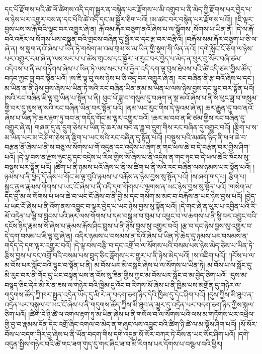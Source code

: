 དང་པོ་རྫོགས་པའི་ཚེ་ལོ་ཚིགས་འདི་དག་སྦྱར་ན་བསྙེན་པར་རྫོགས་པ་མི་འགྲུབ་པ་ནི་མེད་ཀྱི་རྫོགས་པར་བྱེད་པ་ལ་ཉེས་པར་འགྱུར་བས་ན་དང་པོའི་ཚེ་འདི་དང་མ་སྦྱོར་ཅིག་པའོ། །མ་ཚང་བར་བསྙེན་པར་རྫོགས་པའོ།། །།ཇི་ལྟར་བྱས་པས་ས་རྐོ་བའི་ལྟུང་བར་འགྱུར་ཞེ་ན། རྐོ་འམ་རྐོར་བཅུག་ནའོ་ཞེས་པ་ལ་{སྩོགས་,སོགས་}པ་ཡིན་ནོ། །དེ་ལ་རྐོ་བའི་འཇོར་ལ་སོགས་པས་བསྣུན་བའི་གྲངས་བཞིན་དུ་སྦྱོར་བ་དང་རྩ་བར་བརྩིའོ། །བརྐོས་སམ་རྐོར་བཅུག་པ་ཅི་ལ་ཞེ་ན། ས་སྣག་ནའོ་ཞེས་པ་ཡིན་ཏེ་གསེག་མ་འམ་གྲམ་ས་མ་ཡིན་གྱི་སྣག་གི་ཡིན་ནའོ། །དགེ་སློང་ངོ་ཅོག་ལ་ཉེས་པར་འགྱུར་རམ་ཞེ་ན་ལས་སར་པ་པ་ཚེས་གྲངས་དང་སྦྱོར་ལ་རུང་བར་བྱེད་པ་མེད་ན་ཕུར་བུ་སོར་བཞི་ཙམ་འདེབས་པ་ནི་མ་གཏོགས་ཞེས་པ་ཡིན་ཏེ་ལས་སར་པ་པ་རྐྱེན་འདི་དག་ལྟ་བུས་ཐེབས་པའི་ཚེ་འདི་ཙམ་གྱིས་ཚོད་བཏབ་ཀྱང་བླ་བར་སྟོན་པའོ། །ས་ཇི་ལྟ་བུ་ལས་ཉེས་པ་ཅི་འདྲ་བར་འགྱུར་ཞེ་ན། རང་བཞིན་ནི་རྩ་བའོ་ཞེས་པ་དང་། མ་ཡིན་ན་ནི་ཉེས་བྱས་ཞེས་པ་ཡིན་ཏེ་སའི་རང་བཞིན་ཡིན་ནམ་མ་ཡིན་པ་ལས་ཉེས་བྱས་དང་ལྟུང་བར་སྟོན་པའོ། །སའི་རང་བཞིན་ཇི་ལྟ་བུ་ཡིན་པ་སྟོན་པ་ནི། ཕུང་པོ་ཟླ་བ་གསུམ་དུ་བཞག་ན་སྔ་མའོ་ཞེས་པ་ནི་ས་ཕུང་ཟླ་བ་གསུམ་གྱི་བར་དུ་ལུས་ན་སའི་རང་བཞིན་ཡིན་བར་སྟོན་པའོ། །ནམ་ཡང་རུང་གིས་དེ་ལྟའམ་ཞེ་ན། ཆར་རྒྱུན་དུ་བབ་ནའོ་ཞེས་པ་ཡིན་ཏེ་ཆར་རྟག་ཏུ་བབ་ན་གདོད་གོང་མ་ལྟར་འགྱུར་བའོ། །ཆར་མ་བབ་ན་ཇི་ཙམ་གྱིས་རང་བཞིན་དུ་འགྱུར་ཞེ་ན། གཞན་དུ་ན་དྲུག་ཅེས་པ་ཡིན་ཏེ་ཆར་མ་བབ་ན་ཟླ་བ་དྲུག་གིས་རང་བཞིན་དུ་འགྱུར་བའོ། །རྩིག་པ་ས་མ་ཡིན་པར་མ་རེ་ཤིག་ཅེས་ན་རྩིག་པ་ཡང་སའི་རང་བཞིན་དུ་སྟོན་པའོ། །བསྡུས་པའི་མཚན་ཉིད་ནི་ཕལ་ཆེ་བ་བརྩན་ནོ་ཞེས་པ་ནི་ས་བཅུ་ལ་སོགས་པ་གོ་འདུན་དང་འདྲེས་པ་ཞིག་ན་གང་ཕལ་ཆེ་བ་དེ་བརྩན་བར་གྱིས་ཤིག་པའོ། །དེ་ལྟ་བས་ན་རྫས་ཉུང་ངུ་དང་འདྲེས་པ་རིལ་གྱིས་སོ་ཞེས་པ་ནི་འདྲེས་ན་གང་ཉུང་བ་དེ་ཕལ་ཆེའི་ཁོངས་སུ་བསྡུས་པར་སྟོན་པའོ། །ཚིག་པ་ནི་ཉམས་པའོ་ཞེས་པ་ནི་ས་ཚིག་པ་ནི་སའི་རང་བཞིན་ལས་ཉམས་པར་སྟོན་པའོ། །ཉམས་པ་ནི་ཕྱེད་དོ་ཞེས་པ་གོང་མ་ལྟ་བུའི་ཉམས་པ་བརྐོས་ན་ཉེས་བྱས་སུ་སྟོན་པའོ། །ས་ཞག་གད་པ། རྩིག་པ། སྐྱང་ནུལ་རྣམས་གོགས་པ་ཡང་ངོ་ཞེས་པ་ནི་འདི་དག་གོགས་པ་ལྷགས་ན་ཡང་ཉེས་བྱས་སུ་སྟོན་པའོ། །གསེག་མ་དང་བྱེ་མ་ལ་སོགས་པ་ཕལ་ཆེ་བ་ཡང་ངོ་ཞེས་བ་ནི་བྱེ་མ་དང་གསེག་མ་མང་བ་བརྐོས་ན་ཡང་ཉེས་བྱས་པའོ། །བྱེད་པ་ཡང་ངོ་ཞེས་པ་ནི་འོག་ནས་འབྱུང་བ་ལྟར་བྱེད་པ་ཡང་ཉེས་བྱས་སུ་སྟོན་པའོ། །དེ་གང་ཞེ་ན་ཕུར་པ་འབྱིན་པའི་རི་མོ་འདྲེན་པ་ལྕི་བ་བླངས་པའི་ཞར་ལས་གོགས་པ་དམ་བསྒུལ་བ་བུམ་པ་འཕྱང་བ་ལ་ཆགས་པ་ནི་སྙི་བར་འབྱུང་བའི་དངོས་ཉིད་རྣམས་སོ་ཞེས་པ་རྣམས་རྐོས་ཤིང་བྲུས་པ་ནི་ཉེས་བྱས་སུ་འགྱུར་བའོ། །རྩ་བ་དང་ཉེས་བྱས་སུ་འགྱུར་བ་དེ་དག་བསམ་པ་ཇི་ལྟ་བུ་ཞེ་ན། འདིར་ཉམས་པ་བསམས་ན་དེའོ་ཞེས་པ་ཡིན་ཏེ་ཆེད་དུ་ཉམས་པར་བསམས་ན་གདོད་དེ་དག་ལྟར་འགྱུར་བའོ། །དེ་ལྟ་བས་བརྩི་བ་དང་འགྲོ་བ་ལ་སོགས་པའི་བསམ་པས་ཉེས་མེད་ཅེས་པ་ཡིན་ཏེ་རྩིས་བྱས་པ་དང་འགྲོ་བའི་བསམ་པས་བྲུད་ཅིང་རློགས་པར་གྱུར་པ་ནི་ཉེས་མེད་པའོ། །ས་འཇིག་པའོ།། །།བོས་པ་ལ་མ་བོས་པར་སློང་བའི་ལྟུང་བ་སྟོན་པ་ནི། མ་བོས་པར་མི་བསླང་ཞེས་པ་ལ་སོགས་པ་ཡིན་ཏེ། མ་བོས་པ་ལ་སློང་དུ་མི་རུང་བར་ནི་གོང་དུ་ཡང་བསྟན་པས་ན་བོས་སུ་ཟིན་གྱིས་ཀྱང་མ་བོས་པར་སློང་བ་མ་བྱེད་ཅིག་པའོ། །དུས་མ་བསྙད་ཅིང་དེར་མི་རེ་ན་ཟས་ལ་གཉེར་བའི་ཁྱིམ་དུ་འོང་བ་རིགས་སོ་ཞེས་པ་ནི་ཁྱིམ་པས་མགྲོན་དུ་གཉེར་ལ་གདུགས་ཚོད་ཀྱི་ཁར་སྤྱན་འདྲེན་ཡོད་དུ་མི་རེ་ན་བདག་ཅག་ཉིད་དེའི་ཁྱིམ་དུ་དེང་ཤིག་པའོ། །དུས་ཀྱིས་མི་ཐུབ་ན་འདྲེན་པར་བསྐུལ་བ་ཡང་ངོ་ཞེས་པ་ནི་གདུགས་ཚོད་ཀྱིས་མི་ཐུབ་ན་མྱུར་དུ་འདྲེན་པར་བདག་ཅག་ཉིད་ཀྱིས་སྐུལ་ཅིག་པའོ། །ཚིག་དེ་ཉི་ཚེ་ལ་འགལ་རྟག་ཏུ་མ་ཡིན་ཞེས་པ་ནི་གསོལ་བ་ལ་སོགས་པའི་ལས་མ་གཏོགས་པར་འཕྲལ་གྱི་བྱ་བ་རྣམས་དོན་དེར་འགྲོ་ཞིང་འགལ་བ་མེད་ན་གཞུང་ལས་འབྱུང་བའི་ཚིག་ཉི་ཚེ་ལ་མ་ལྟོས་ཤིག་པའོ། །སོ་སོར་བོས་པ་བདག་གིར་བྱ་ཞེས་པ་ནི་ཡོན་བདག་གིས་དགེ་འདུན་སོ་སོར་བཀར་ཏེ་བོས་ན་ཡང་སོང་ཤིག་པའོ། །དགེ་འདུན་སྤྱིས་གཉེར་བའི་ཚེ་གང་ཟག་གུད་དུ་གར་ཞིང་ཟ་བ་མི་རིགས་པར་དོགས་པ་བསྩལ་བའི་ཕྱིར། 
